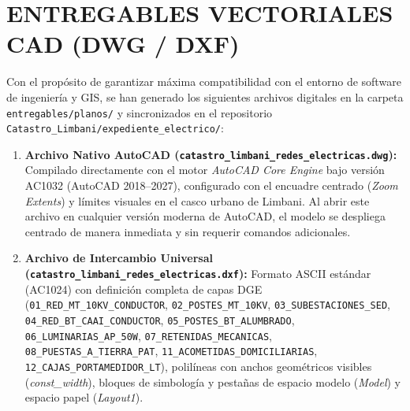 \section{ENTREGABLES VECTORIALES CAD (DWG / DXF)}

Con el propósito de garantizar máxima compatibilidad con el entorno de software de ingeniería y GIS, se han generado los siguientes archivos digitales en la carpeta \texttt{entregables/planos/} y sincronizados en el repositorio \texttt{Catastro\_Limbani/expediente\_electrico/}:

\begin{enumerate}
    \item \textbf{Archivo Nativo AutoCAD (\texttt{catastro\_limbani\_redes\_electricas.dwg}):} Compilado directamente con el motor \textit{AutoCAD Core Engine} bajo versión AC1032 (AutoCAD 2018--2027), configurado con el encuadre centrado (\textit{Zoom Extents}) y límites visuales en el casco urbano de Limbani. Al abrir este archivo en cualquier versión moderna de AutoCAD, el modelo se despliega centrado de manera inmediata y sin requerir comandos adicionales.
    \item \textbf{Archivo de Intercambio Universal (\texttt{catastro\_limbani\_redes\_electricas.dxf}):} Formato ASCII estándar (AC1024) con definición completa de capas DGE (\texttt{01\_RED\_MT\_10KV\_CONDUCTOR}, \texttt{02\_POSTES\_MT\_10KV}, \texttt{03\_SUBESTACIONES\_SED}, \texttt{04\_RED\_BT\_CAAI\_CONDUCTOR}, \texttt{05\_POSTES\_BT\_ALUMBRADO}, \texttt{06\_LUMINARIAS\_AP\_50W}, \texttt{07\_RETENIDAS\_MECANICAS}, \texttt{08\_PUESTAS\_A\_TIERRA\_PAT}, \texttt{11\_ACOMETIDAS\_DOMICILIARIAS}, \texttt{12\_CAJAS\_PORTAMEDIDOR\_LT}), polilíneas con anchos geométricos visibles (\textit{const\_width}), bloques de simbología y pestañas de espacio modelo (\textit{Model}) y espacio papel (\textit{Layout1}).
\end{enumerate}

\noindent{}

